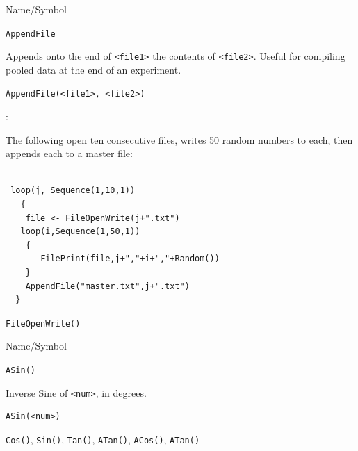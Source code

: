\begin{desc}{Name/Symbol}

\item[Name/Symbol]  	\verb+AppendFile+
  
\item[Description]  	Appends onto the end of \verb+<file1>+ the contents of \verb+<file2>+.  Useful for compiling pooled data at the end of an experiment.

\item[Usage] 
\begin{verbatim}
AppendFile(<file1>, <file2>)
\end{verbatim}

\item[Example]:

The following open ten consecutive files, writes 50 random numbers to each, then appends each to a master file:

\begin{verbatim}

 loop(j, Sequence(1,10,1))
   {
    file <- FileOpenWrite(j+".txt")
   loop(i,Sequence(1,50,1))
    {
       FilePrint(file,j+","+i+","+Random())
    }
    AppendFile("master.txt",j+".txt")
  }
\end{verbatim}

\item[See Also]     	\verb+FileOpenWrite()+
\end{desc}






\begin{desc}{Name/Symbol}

\item[Name/Symbol]  	\verb+ASin()+ 

\item[Description]  	Inverse Sine of \verb+<num>+, in degrees.

\item[Usage]
\begin{verbatim}
ASin(<num>)
\end{verbatim}

\item[Example]	

\item[See Also]    	 \verb+Cos()+, \verb+Sin()+, \verb+Tan()+, \verb+ATan()+, \verb+ACos()+, \verb+ATan()+ 
\end{desc}





